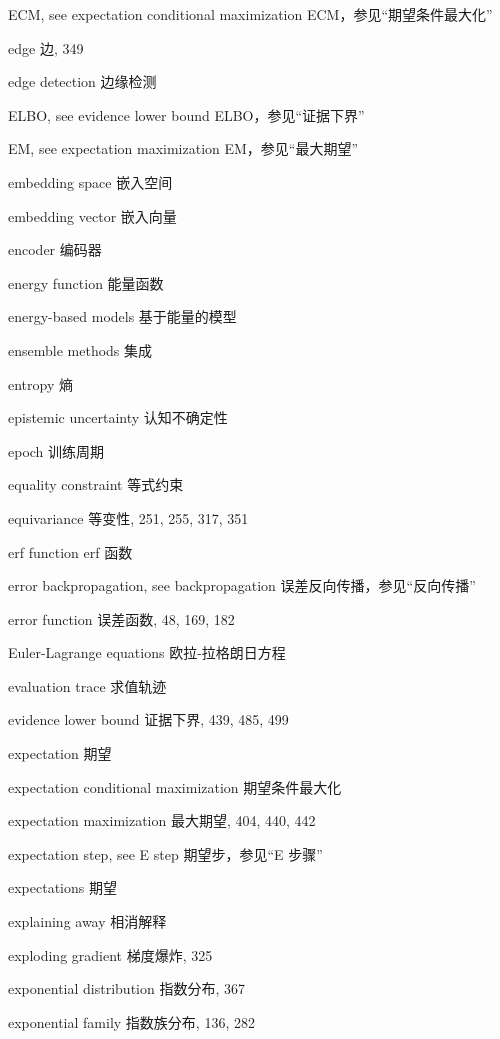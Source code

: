 ECM, see expectation conditional maximization ECM，参见“期望条件最大化”\par
edge 边, 349\par
edge detection 边缘检测\par
ELBO, see evidence lower bound ELBO，参见“证据下界”\par
EM, see expectation maximization EM，参见“最大期望”\par
embedding space 嵌入空间\par
embedding vector 嵌入向量\par
encoder 编码器\par
energy function 能量函数\par
energy-based models 基于能量的模型\par
ensemble methods 集成\par
entropy 熵\par
epistemic uncertainty 认知不确定性\par
epoch 训练周期\par
equality constraint 等式约束\par
equivariance 等变性, 251, 255, 317, 351\par
erf function erf 函数\par
error backpropagation, see backpropagation 误差反向传播，参见“反向传播”\par
error function 误差函数, 48, 169, 182\par
Euler-Lagrange equations 欧拉-拉格朗日方程\par
evaluation trace 求值轨迹\par
evidence lower bound 证据下界, 439, 485, 499\par
expectation 期望\par
expectation conditional maximization 期望条件最大化\par
expectation maximization 最大期望, 404, 440, 442\par
expectation step, see E step 期望步，参见“E 步骤”\par
expectations 期望\par
explaining away 相消解释\par
exploding gradient 梯度爆炸, 325\par
exponential distribution 指数分布, 367\par
exponential family 指数族分布, 136, 282\par
